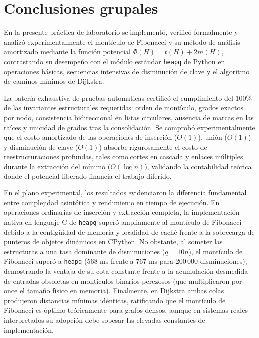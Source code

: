 \section{Conclusiones grupales}

En la presente práctica de laboratorio se implementó, verificó formalmente y analizó experimentalmente el montículo de Fibonacci y su método de análisis amortizado mediante la función potencial $\Phi(H) = t(H) + 2m(H)$, contrastando su desempeño con el módulo estándar \texttt{heapq} de Python en operaciones básicas, secuencias intensivas de disminución de clave y el algoritmo de caminos mínimos de Dijkstra.

La batería exhaustiva de pruebas automáticas certificó el cumplimiento del $100\%$ de las invariantes estructurales requeridas: orden de montículo, grados exactos por nodo, consistencia bidireccional en listas circulares, ausencia de marcas en las raíces y unicidad de grados tras la consolidación. Se comprobó experimentalmente que el costo amortizado de las operaciones de inserción ($O(1)$), unión ($O(1)$) y disminución de clave ($O(1)$) absorbe rigurosamente el costo de reestructuraciones profundas, tales como cortes en cascada y enlaces múltiples durante la extracción del mínimo ($O(\log n)$), validando la contabilidad teórica donde el potencial liberado financia el trabajo diferido.

En el plano experimental, los resultados evidenciaron la diferencia fundamental entre complejidad asintótica y rendimiento en tiempo de ejecución. En operaciones ordinarias de inserción y extracción completa, la implementación nativa en lenguaje C de \texttt{heapq} superó ampliamente al montículo de Fibonacci debido a la contigüidad de memoria y localidad de caché frente a la sobrecarga de punteros de objetos dinámicos en CPython. No obstante, al someter las estructuras a una tasa dominante de disminuciones ($q = 10n$), el montículo de Fibonacci superó a \texttt{heapq} (568 ms frente a 767 ms para 200\,000 disminuciones), demostrando la ventaja de su cota constante frente a la acumulación desmedida de entradas obsoletas en montículos binarios perezosos (que multiplicaron por once el tamaño físico en memoria). Finalmente, en Dijkstra ambas colas produjeron distancias mínimas idénticas, ratificando que el montículo de Fibonacci es óptimo teóricamente para grafos densos, aunque en sistemas reales interpretados su adopción debe sopesar las elevadas constantes de implementación.
